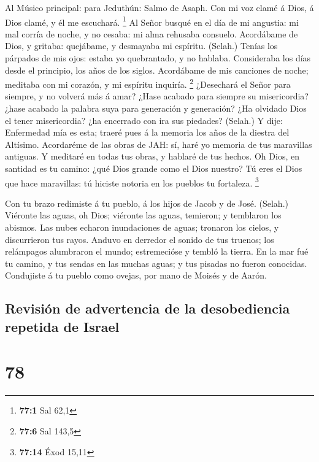  Al Músico principal: para Jeduthún: Salmo de Asaph. Con mi
voz clamé á Dios, á Dios clamé, y él me escuchará. \footnote{\textbf{77:1}
  Sal 62,1}  Al Señor busqué en el día de mi angustia: mi
mal corría de noche, y no cesaba: mi alma rehusaba consuelo.
 Acordábame de Dios, y gritaba: quejábame, y desmayaba mi
espíritu. (Selah.)  Tenías los párpados de mis ojos: estaba
yo quebrantado, y no hablaba.  Consideraba los días desde el
principio, los años de los siglos.  Acordábame de mis
canciones de noche; meditaba con mi corazón, y mi espíritu inquiría.
\footnote{\textbf{77:6} Sal 143,5}  ¿Desechará el Señor para
siempre, y no volverá más á amar?  ¿Hase acabado para
siempre su misericordia? ¿hase acabado la palabra suya para generación y
generación?  ¿Ha olvidado Dios el tener misericordia? ¿ha
encerrado con ira sus piedades? (Selah.)  Y dije:
Enfermedad mía es esta; traeré pues á la memoria los años de la diestra
del Altísimo.  Acordaréme de las obras de JAH: sí, haré yo
memoria de tus maravillas antiguas.  Y meditaré en todas
tus obras, y hablaré de tus hechos.  Oh Dios, en santidad
es tu camino: ¿qué Dios grande como el Dios nuestro?  Tú
eres el Dios que hace maravillas: tú hiciste notoria en los pueblos tu
fortaleza. \footnote{\textbf{77:14} Éxod 15,11}

 Con tu brazo redimiste á tu pueblo, á los hijos de Jacob y
de José. (Selah.)  Viéronte las aguas, oh Dios; viéronte
las aguas, temieron; y temblaron los abismos.  Las nubes
echaron inundaciones de aguas; tronaron los cielos, y discurrieron tus
rayos.  Anduvo en derredor el sonido de tus truenos; los
relámpagos alumbraron el mundo; estremecióse y tembló la tierra.
 En la mar fué tu camino, y tus sendas en las muchas aguas;
y tus pisadas no fueron conocidas.  Condujiste á tu pueblo
como ovejas, por mano de Moisés y de Aarón.

\hypertarget{revisiuxf3n-de-advertencia-de-la-desobediencia-repetida-de-israel}{%
\subsection{Revisión de advertencia de la desobediencia repetida de
Israel}\label{revisiuxf3n-de-advertencia-de-la-desobediencia-repetida-de-israel}}

\hypertarget{section-77}{%
\section{78}\label{section-77}}

